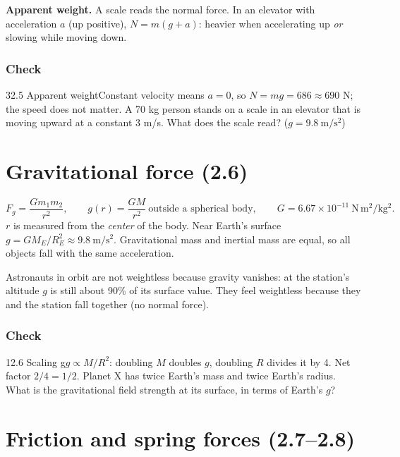 \documentclass[11pt]{article}
\begin{document}
\textbf{Apparent weight.} A scale reads the normal force. In an elevator with acceleration $a$ (up positive), $N = m(g + a)$: heavier when accelerating up \emph{or} slowing while moving down.

\subsubsection{Check}\mbox{}

\begin{q}{3}{2.5 Apparent weight}{Constant velocity means $a = 0$, so $N = mg = 686 \approx 690$ N; the speed does not matter.}
A 70 kg person stands on a scale in an elevator that is moving upward at a constant $3$ m/s. What does the scale read? ($g = 9.8\ \mathrm{m/s^2}$)
\end{q}

\section{Gravitational force (2.6)}\label{sec:3}

\[ F_g = \frac{G m_1 m_2}{r^2}, \qquad g(r) = \frac{GM}{r^2}\ \text{outside a spherical body}, \qquad G = 6.67\times10^{-11}\ \mathrm{N\,m^2/kg^2}. \]
$r$ is measured from the \emph{center} of the body. Near Earth's surface $g = GM_E/R_E^2 \approx 9.8\ \mathrm{m/s^2}$. Gravitational mass and inertial mass are equal, so all objects fall with the same acceleration.

\begin{trap}
Astronauts in orbit are not weightless because gravity vanishes: at the station's altitude $g$ is still about 90\% of its surface value. They feel weightless because they and the station fall together (no normal force).
\end{trap}

\subsubsection{Check}\mbox{}

\begin{q}{1}{2.6 Scaling g}{$g \propto M/R^2$: doubling $M$ doubles $g$, doubling $R$ divides it by 4. Net factor $2/4 = 1/2$.}
Planet X has twice Earth's mass and twice Earth's radius. What is the gravitational field strength at its surface, in terms of Earth's $g$?
\end{q}

\section{Friction and spring forces (2.7--2.8)}\label{sec:4}
\end{document}
